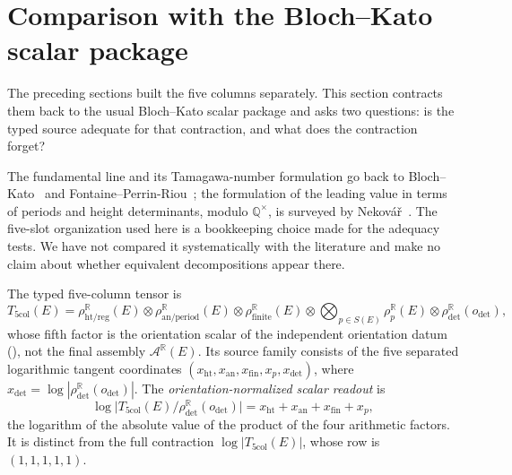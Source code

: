 \documentclass[11pt]{article}
\theoremstyle{definition}
\newcommand{\Q}{\mathbb{Q}}
\newcommand{\R}{\mathbb{R}}
\begin{document}
 \section[Comparison with the Bloch--Kato scalar package]{Comparison with the Bloch--Kato scalar package}
\label{sec:comparison}

The preceding sections built the five columns separately.  This section
contracts them back to the usual Bloch--Kato scalar package and asks two
questions: is the typed source adequate for that contraction, and what
does the contraction forget?

\begin{remark}\label{rmk:apparatus:five-column-literature-gap}
The fundamental line and its Tamagawa-number formulation go back to
Bloch--Kato~\citep[\S5]{BlochKato1990} and
Fontaine--Perrin-Riou~\citep{FontainePerrinRiou1994}; the formulation of
the leading value in terms of periods and height determinants, modulo
$\Q^\times$, is surveyed by Nekov\'a\v{r}~\citep{Nekovar1994}.  The
five-slot organization used here is a bookkeeping choice made for the
adequacy tests.  We have not compared it systematically with the
literature and make no claim about whether equivalent decompositions
appear there.
\end{remark}

\begin{definition}\label{def:apparatus:five-column-tensor}
The typed five-column tensor is
\[
  T_{\mathrm{5col}}(E)
  =
  \rho_{\mathrm{ht/reg}}^{\R}(E)
  \otimes
  \rho_{\mathrm{an/period}}^{\R}(E)
  \otimes
  \rho_{\mathrm{finite}}^{\R}(E)
  \otimes
  \bigotimes_{p\in S(E)}\rho_p^{\R}(E)
  \otimes
  \rho_{\det}^{\R}(o_{\det}),
\]
whose fifth factor is the orientation scalar of the independent
orientation datum (), not the final
assembly $\mathcal A^{\R}(E)$.  Its source family consists of the five
separated logarithmic tangent coordinates
$(x_{\mathrm{ht}},x_{\mathrm{an}},x_{\mathrm{fin}},x_p,x_{\det})$, where
$x_{\det}=\log|\rho_{\det}^{\R}(o_{\det})|$.  The
\emph{orientation-normalized scalar readout} is
\[
  \log\bigl|T_{\mathrm{5col}}(E)\big/\rho_{\det}^{\R}(o_{\det})\bigr|
  =x_{\mathrm{ht}}+x_{\mathrm{an}}+x_{\mathrm{fin}}+x_p ,
\]
the logarithm of the absolute value of the product of the four arithmetic
factors.  It is distinct from the full contraction
$\log|T_{\mathrm{5col}}(E)|$, whose row is $(1,1,1,1,1)$.
\end{definition}
\end{document}
